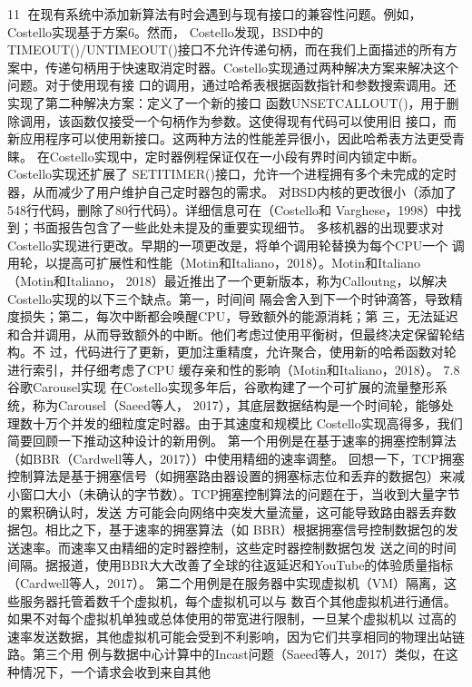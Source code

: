                                                                11
在现有系统中添加新算法有时会遇到与现有接口的兼容性问题。例如，Costello实现基于方案6。然而，
Costello发现，BSD中的TIMEOUT()/UNTIMEOUT()接口不允许传递句柄，而在我们上面描述的所有方
案中，传递句柄用于快速取消定时器。Costello实现通过两种解决方案来解决这个问题。对于使用现有接
口的调用，通过哈希表根据函数指针和参数搜索调用。还实现了第二种解决方案：定义了一个新的接口
函数UNSETCALLOUT()，用于删除调用，该函数仅接受一个句柄作为参数。这使得现有代码可以使用旧
接口，而新应用程序可以使用新接口。这两种方法的性能差异很小，因此哈希表方法更受青睐。
在Costello实现中，定时器例程保证仅在一小段有界时间内锁定中断。Costello实现还扩展了
SETITIMER()接口，允许一个进程拥有多个未完成的定时器，从而减少了用户维护自己定时器包的需求。
对BSD内核的更改很小（添加了548行代码，删除了80行代码）。详细信息可在（Costello和
Varghese，1998）中找到；书面报告包含了一些此处未提及的重要实现细节。
多核机器的出现要求对Costello实现进行更改。早期的一项更改是，将单个调用轮替换为每个CPU一个
调用轮，以提高可扩展性和性能（Motin和Italiano，2018）。Motin和Italiano（Motin和Italiano，
2018）最近推出了一个更新版本，称为Calloutng，以解决Costello实现的以下三个缺点。第一，时间间
隔会舍入到下一个时钟滴答，导致精度损失；第二，每次中断都会唤醒CPU，导致额外的能源消耗；第
三，无法延迟和合并调用，从而导致额外的中断。他们考虑过使用平衡树，但最终决定保留轮结构。不
过，代码进行了更新，更加注重精度，允许聚合，使用新的哈希函数对轮进行索引，并仔细考虑了CPU
缓存亲和性的影响（Motin和Italiano，2018）。
7.8 谷歌Carousel实现
在Costello实现多年后，谷歌构建了一个可扩展的流量整形系统，称为Carousel（Saeed等人，
2017），其底层数据结构是一个时间轮，能够处理数十万个并发的细粒度定时器。由于其速度和规模比
Costello实现高得多，我们简要回顾一下推动这种设计的新用例。
第一个用例是在基于速率的拥塞控制算法（如BBR（Cardwell等人，2017））中使用精细的速率调整。
回想一下，TCP拥塞控制算法是基于拥塞信号（如拥塞路由器设置的拥塞标志位和丢弃的数据包）来减
小窗口大小（未确认的字节数）。TCP拥塞控制算法的问题在于，当收到大量字节的累积确认时，发送
方可能会向网络中突发大量流量，这可能导致路由器丢弃数据包。相比之下，基于速率的拥塞算法（如
BBR）根据拥塞信号控制数据包的发送速率。而速率又由精细的定时器控制，这些定时器控制数据包发
送之间的时间间隔。据报道，使用BBR大大改善了全球的往返延迟和YouTube的体验质量指标
（Cardwell等人，2017）。
第二个用例是在服务器中实现虚拟机（VM）隔离，这些服务器托管着数千个虚拟机，每个虚拟机可以与
数百个其他虚拟机进行通信。如果不对每个虚拟机单独或总体使用的带宽进行限制，一旦某个虚拟机以
过高的速率发送数据，其他虚拟机可能会受到不利影响，因为它们共享相同的物理出站链路。第三个用
例与数据中心计算中的Incast问题（Saeed等人，2017）类似，在这种情况下，一个请求会收到来自其他

